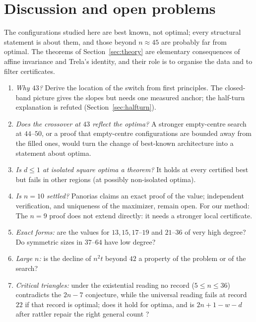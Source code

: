 \documentclass[11pt]{amsart}
\theoremstyle{definition}
\begin{document}
\section{Discussion and open problems}\label{sec:open}
The configurations studied here are best known, not optimal; every structural statement is about them, and those beyond $n \approx 45$ are probably far from optimal. The theorems of Section~\ref{sec:theory} are elementary consequences of affine invariance and Trela's identity, and their role is to organise the data and to filter certificates.
\begin{enumerate}[label=(\arabic*)]
\item \emph{Why $43$?} Derive the location of the switch from first principles. The closed-band picture gives the slopes but needs one measured anchor; the half-turn explanation is refuted (Section~\ref{sec:halfturn}).
\item \emph{Does the crossover at $43$ reflect the optima?} A stronger empty-centre search at $44$--$50$, or a proof that empty-centre configurations are bounded away from the filled ones, would turn the change of best-known architecture into a statement about optima.
\item \emph{Is $d \le 1$ at isolated square optima a theorem?} It holds at every certified best but fails in other regions (at possibly non-isolated optima).
\item \emph{Is $n = 10$ settled?} Panorias \cite{Pan10} claims an exact proof of the value; independent verification, and uniqueness of the maximizer, remain open. For our method: The $n = 9$ proof \cite{N9} does not extend directly: it needs a stronger local certificate.
\item \emph{Exact forms:} are the values for $13, 15, 17$--$19$ and $21$--$36$ of very high degree? Do symmetric sizes in $37$--$64$ have low degree?
\item \emph{Large $n$:} is the decline of $n^2t$ beyond $42$ a property of the problem or of the search?
\item \emph{Critical triangles:} under the existential reading no record ($5 \le n \le 36$) contradicts the $2n-7$ conjecture, while the universal reading fails at record $22$ if that record is optimal; does it hold for optima, and is $2n+1-w-d$ after rattler repair the right general count \cite{Note2}?
\end{enumerate}
\end{document}
